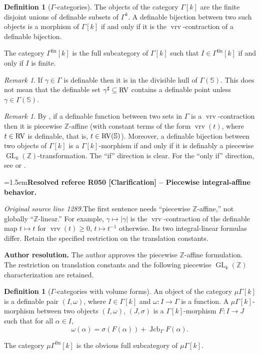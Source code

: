\documentclass[12pt]{amsart}
\newcommand{\ResolvedRefereeRemark}[5]{%
  \par\medskip\begingroup\normalfont\small\color{gray}%
  \emergencystretch=1.5em\noindent\textbf{Resolved referee R#1 [#2] -- #3.}\par\nobreak\noindent #4\par
  \medskip\color{ResolutionGreen}\noindent\textbf{Author resolution.} #5\par
  \endgroup\medskip
}
\theoremstyle{plain}
\theoremstyle{definition}
\newtheorem{defn}[thm]{Definition}
\theoremstyle{remark}
\newtheorem{rem}[thm]{Remark}
\numberwithin{equation}{section}
\theoremstyle{plain}
\newcommand{\RV}{\textup{RV}}
\DeclareMathOperator{\mgl}{GL}
\DeclareMathOperator{\jcb}{Jcb}
\newcommand{\Z}{\mathds{Z}}
\newcommand{\0}{\emptyset}
\newcommand{\fun}{\longrightarrow}
\newcommand{\sub}{\subseteq}
\newcommand{\mG}{{\mu}{\Gamma}}
\DeclareMathOperator{\fin}{fin}
\DeclareMathOperator{\vrv}{vrv}
\begin{document}
\begin{defn}[$\Gamma$-categories]\label{def:Ga:cat}
The objects of the category $\Gamma[k]$ are the finite disjoint unions of definable subsets of $\Gamma^k$. A definable bijection between  two such objects is a  morphism of $\Gamma[k]$ if and only if it is the $\vrv$-contraction of a definable bijection.


The category $\Gamma^{\fin}[k]$ is the full subcategory of $\Gamma[k]$ such that $I \in \Gamma^{\fin}[k]$ if and only if $I$ is finite.
\end{defn}

\begin{rem}
If $\gamma \in \Gamma$ is definable then it is in the divisible hull of $\Gamma(\mathbb{S})$. This does not mean that the definable set $\gamma^{\sharp} \sub \RV$ contains a definable point unless $\gamma \in \Gamma(\mathbb{S})$.
\end{rem}


\begin{rem}\label{GLZ:char}
By \cite[Remark~2.28]{Yin:int:expan:acvf}, if a definable function between two sets in $\Gamma$ is a $\vrv$-contraction then it is piecewise $\Z$-affine (with constant terms of the form $\vrv(t)$, where $t \in \RV$ is definable, that is, $t \in \RV(\mathbb{S})$). Moreover,  a definable bijection  between two objects of $\Gamma[k]$ is a  $\Gamma[k]$-morphism if and only if it is definably a piecewise $\mgl_k(\Z)$-transformation. The ``if'' direction is clear. For the ``only if'' direction, see \cite[Lemma~10.1]{hrushovski:kazhdan:integration:vf} or \cite[Lemma~2.29]{Yin:int:expan:acvf}.

\ResolvedRefereeRemark{050}{Clarification}{Piecewise integral-affine behavior}{%
\textit{Original source line 1289.}\quad The first sentence needs ``piecewise $\mathbb Z$-affine,'' not globally ``$\mathbb Z$-linear.'' For example, $\gamma\mapsto |\gamma|$ is the $\vrv$-contraction of the definable map $t\mapsto t$ for $\vrv(t)\geq0$, $t\mapsto t^{-1}$ otherwise. Its two integral-linear formulas differ. Retain the specified restriction on the translation constants.
}{The author approves the piecewise $\Z$-affine formulation. The restriction on translation constants and the following piecewise $\mgl_k(\Z)$ characterization are retained.}
\end{rem}


\begin{defn}[$\Gamma$-categories with volume forms]\label{def:Ga:cat:mu}
An object of the category $\mG[k]$ is a definable pair $(I, \omega)$, where $I \in \Gamma[k]$ and $\omega : I \fun \Gamma$ is a function. A $\mG[k]$-morphism between two objects $(I, \omega)$, $(J, \sigma)$ is a $\Gamma[k]$-morphism $F : I \fun J$ such that for all $\alpha  \in I$,
\[
\omega(\alpha) = \sigma(F(\alpha)) + \jcb_{\Gamma} F(\alpha).
\]

The category $\mG^{\fin}[k]$ is the obvious full subcategory of $\mG[k]$.
\end{defn}
\end{document}
